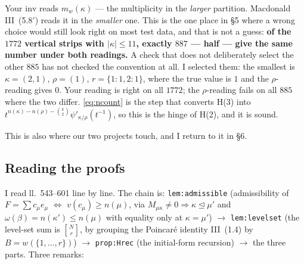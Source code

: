 \documentclass[11pt]{article}
\newcommand{\qbin}[2]{\genfrac{[}{]}{0pt}{}{#1}{#2}}
\begin{document}
Your $\mathrm{inv}$ reads $m_w(\kappa)$ --- the multiplicity in the \emph{larger} partition. Macdonald
III~(5.8$'$) reads it in the \emph{smaller} one. This is the one place in \S5 where a wrong choice
would still look right on most test data, and that is not a guess: \textbf{of the $1772$ vertical
strips with $|\kappa|\le11$, exactly $887$ --- half --- give the same number under both readings.}
A check that does not deliberately select the other $885$ has not checked the convention at all.
I selected them: the smallest is $\kappa=(2,1)$, $\rho=(1)$, $r=\{1{:}1,2{:}1\}$, where the true value
is $1$ and the $\rho$-reading gives $0$. Your reading is right on all $1772$; the $\rho$-reading fails
on all $885$ where the two differ. \eqref{eq:ncount} is the step that converts H(3) into
$t^{n(\kappa)-n(\rho)-\binom k2}\psi'_{\kappa/\rho}(t^{-1})$, so this is the hinge of H(2), and it is sound.

This is also where our two projects touch, and I return to it in \S6.

\subsection{Reading the proofs}

I read ll.~543--601 line by line. The chain is: \texttt{lem:admissible} (admissibility of
$F=\sum c_\mu e_\mu$ $\Leftrightarrow$ $v(c_\mu)\ge n(\mu)$, via $M_{\mu\kappa}\ne0\Rightarrow
\kappa\trianglelefteq\mu'$ and $\omega(\beta)=n(\kappa')\le n(\mu)$ with equality only at
$\kappa=\mu'$) $\to$ \texttt{lem:levelset} (the level-set sum is $\qbin Nr$, by grouping the
Poincar\'e identity III~(1.4) by $B=w(\{1,\dots,r\})$) $\to$ \texttt{prop:Hrec} (the initial-form
recursion) $\to$ the three parts. Three remarks:
\end{document}
